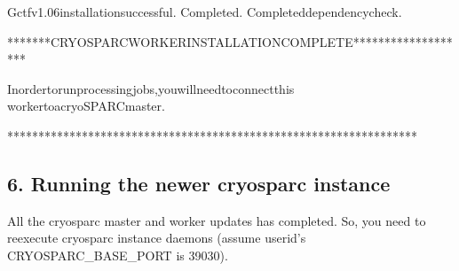 \documentclass[a4paper,10pt,english]{sphinxmanual}
\begin{document}
\begin{sphinxVerbatim}[commandchars=\\\{\}]
\PYGZhy{}\PYGZhy{}\PYGZhy{}\PYGZhy{}\PYGZhy{}\PYGZhy{}\PYGZhy{}\PYGZhy{}\PYGZhy{}\PYGZhy{}\PYGZhy{}\PYGZhy{}\PYGZhy{}\PYGZhy{}\PYGZhy{}\PYGZhy{}\PYGZhy{}\PYGZhy{}\PYGZhy{}\PYGZhy{}\PYGZhy{}\PYGZhy{}\PYGZhy{}\PYGZhy{}\PYGZhy{}\PYGZhy{}\PYGZhy{}\PYGZhy{}\PYGZhy{}\PYGZhy{}\PYGZhy{}\PYGZhy{}\PYGZhy{}\PYGZhy{}\PYGZhy{}\PYGZhy{}\PYGZhy{}\PYGZhy{}\PYGZhy{}\PYGZhy{}\PYGZhy{}\PYGZhy{}\PYGZhy{}\PYGZhy{}\PYGZhy{}\PYGZhy{}\PYGZhy{}\PYGZhy{}\PYGZhy{}\PYGZhy{}\PYGZhy{}\PYGZhy{}\PYGZhy{}\PYGZhy{}\PYGZhy{}\PYGZhy{}\PYGZhy{}\PYGZhy{}\PYGZhy{}\PYGZhy{}\PYGZhy{}\PYGZhy{}\PYGZhy{}\PYGZhy{}\PYGZhy{}\PYGZhy{}\PYGZhy{}\PYGZhy{}\PYGZhy{}\PYGZhy{}\PYGZhy{}\PYGZhy{}
Gctfv1.06installationsuccessful.
\PYGZhy{}\PYGZhy{}\PYGZhy{}\PYGZhy{}\PYGZhy{}\PYGZhy{}\PYGZhy{}\PYGZhy{}\PYGZhy{}\PYGZhy{}\PYGZhy{}\PYGZhy{}\PYGZhy{}\PYGZhy{}\PYGZhy{}\PYGZhy{}\PYGZhy{}\PYGZhy{}\PYGZhy{}\PYGZhy{}\PYGZhy{}\PYGZhy{}\PYGZhy{}\PYGZhy{}\PYGZhy{}\PYGZhy{}\PYGZhy{}\PYGZhy{}\PYGZhy{}\PYGZhy{}\PYGZhy{}\PYGZhy{}\PYGZhy{}\PYGZhy{}\PYGZhy{}\PYGZhy{}\PYGZhy{}\PYGZhy{}\PYGZhy{}\PYGZhy{}\PYGZhy{}\PYGZhy{}\PYGZhy{}\PYGZhy{}\PYGZhy{}\PYGZhy{}\PYGZhy{}\PYGZhy{}\PYGZhy{}\PYGZhy{}\PYGZhy{}\PYGZhy{}\PYGZhy{}\PYGZhy{}\PYGZhy{}\PYGZhy{}\PYGZhy{}\PYGZhy{}\PYGZhy{}\PYGZhy{}\PYGZhy{}\PYGZhy{}\PYGZhy{}\PYGZhy{}\PYGZhy{}\PYGZhy{}\PYGZhy{}\PYGZhy{}\PYGZhy{}\PYGZhy{}\PYGZhy{}\PYGZhy{}
Completed.
Completeddependencycheck.

*******CRYOSPARCWORKERINSTALLATIONCOMPLETE*******************

Inordertorunprocessingjobs,youwillneedtoconnectthis
workertoacryoSPARCmaster.

******************************************************************
\end{sphinxVerbatim}


\subsection{6. Running the newer cryosparc instance}
\label{\detokenize{faq:running-the-newer-cryosparc-instance}}
\sphinxAtStartPar
All the cryosparc master and worker updates has completed. So, you need to re\sphinxhyphen{}execute cryosparc instance daemons (assume userid’s CRYOSPARC\_BASE\_PORT is 39030).
\end{document}
